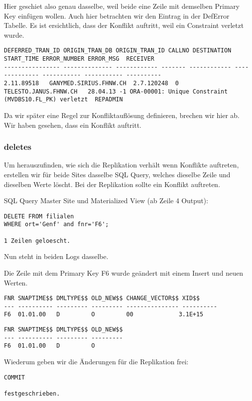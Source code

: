 \documentclass[11pt,a4paper,parskip=half]{scrartcl}
\begin{document}
Hier geschiet also genau dasselbe, weil beide eine Zeile mit demselben Primary Key einfügen wollen. Auch hier betrachten wir den Eintrag in der DefError Tabelle. Es ist ersichtlich, dass der Konflikt auftritt, weil ein Constraint verletzt wurde.
\begin{lstlisting}
DEFERRED_TRAN_ID ORIGIN_TRAN_DB ORIGIN_TRAN_ID CALLNO DESTINATION START_TIME ERROR_NUMBER ERROR_MSG  RECEIVER
---------------- -------------- ------------ ------- ------------ -------------- ----------- ----------- ----------
2.11.89518   GANYMED.SIRIUS.FHNW.CH  2.7.120248  0 TELESTO.JANUS.FHNW.CH   28.04.13 -1 ORA-00001: Unique Constraint (MVDBS10.FL_PK) verletzt  REPADMIN
\end{lstlisting}

Da wir später eine Regel zur Konfliktauflösung definieren, brechen wir hier ab. Wir haben gesehen, dass ein Konflikt auftritt.
\subsubsection{deletes}
Um herauszufinden, wie sich die Replikation verhält wenn Konflikte auftreten, erstellen wir für beide Sites dasselbe SQL Query, welches dieselbe Zeile und dieselben Werte löscht. Bei der Replikation sollte ein Konflikt auftreten.

SQL Query Master Site und Materialized View (ab Zeile 4 Output):
\begin{lstlisting}
DELETE FROM filialen
WHERE ort='Genf' and fnr='F6'; 

1 Zeilen geloescht.
\end{lstlisting}

Nun steht in beiden Logs dasselbe.

Die Zeile mit dem Primary Key F6 wurde geändert mit einem Insert und neuen Werten.
\begin{lstlisting}
FNR SNAPTIME$$ DMLTYPE$$ OLD_NEW$$ CHANGE_VECTOR$$ XID$$
--- ---------- --------- --------- --------------- ----------
F6  01.01.00   D         O         00             3.1E+15 
\end{lstlisting}
\begin{lstlisting}
FNR SNAPTIME$$ DMLTYPE$$ OLD_NEW$$
--- ---------- --------- ---------
F6  01.01.00   D         O         
\end{lstlisting}

Wiederum geben wir die Änderungen für die Replikation frei:
\begin{lstlisting}
COMMIT

festgeschrieben.
\end{lstlisting}
\end{document}
